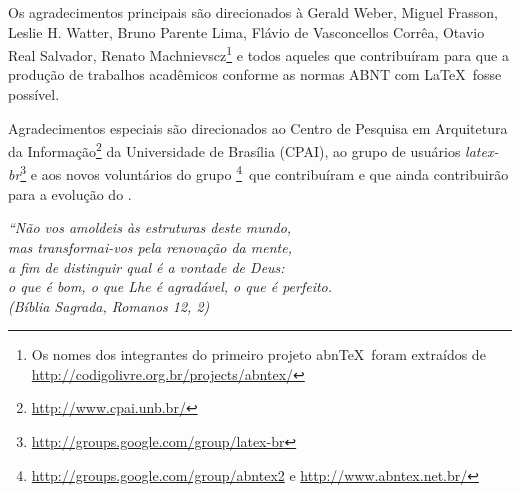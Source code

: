 \documentclass[
	10pt,				%
	openright,			%
	twoside,			%
	a4paper,			%
	chapter=TITLE,		%
	english,			%
	brazil				%
	]{abntex2}
\begin{document}
\begin{agradecimentos}
Os agradecimentos principais são direcionados à Gerald Weber, Miguel Frasson,
Leslie H. Watter, Bruno Parente Lima, Flávio de Vasconcellos Corrêa, Otavio Real
Salvador, Renato Machnievscz\footnote{Os nomes dos integrantes do primeiro
projeto abn\TeX\ foram extraídos de
\url{http://codigolivre.org.br/projects/abntex/}} e todos aqueles que
contribuíram para que a produção de trabalhos acadêmicos conforme
as normas ABNT com \LaTeX\ fosse possível.

Agradecimentos especiais são direcionados ao Centro de Pesquisa em Arquitetura
da Informação\footnote{\url{http://www.cpai.unb.br/}} da Universidade de
Brasília (CPAI), ao grupo de usuários
\emph{latex-br}\footnote{\url{http://groups.google.com/group/latex-br}} e aos
novos voluntários do grupo
\emph{\abnTeX}\footnote{\url{http://groups.google.com/group/abntex2} e
\url{http://www.abntex.net.br/}}~que contribuíram e que ainda
contribuirão para a evolução do \abnTeX.

\end{agradecimentos}

\begin{epigrafe}
    \vspace*{\fill}
	\begin{flushright}
		\textit{``Não vos amoldeis às estruturas deste mundo, \\
		mas transformai-vos pela renovação da mente, \\
		a fim de distinguir qual é a vontade de Deus: \\
		o que é bom, o que Lhe é agradável, o que é perfeito.\\
		(Bíblia Sagrada, Romanos 12, 2)}
	\end{flushright}
\end{epigrafe}
\end{document}
